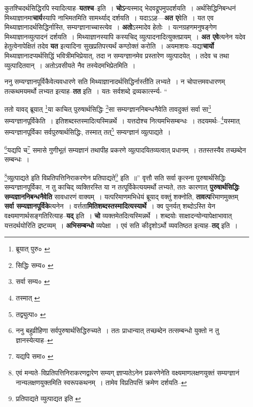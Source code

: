 \documentclass[article,12pt,a4paper]{memoir}
\begin{document}
	  \pstart कुतश्चिदर्थसिद्धिरपि स्यादित्याह--\textbf{यतश्च}--इति । \textbf{चोऽ}न्यस्माद् भेदवद्रूपमुपदर्शयति । अर्थसिद्धिनिबन्धनं मिथ्याज्ञानमा\textbf{चार्य}स्यापि नाभिमतमिति सामर्थ्याद् दर्शयति । यदाऽऽह—\textbf{अत ए}वेति । यत एव मिथ्याज्ञानादर्थसिद्धिर्नास्ति, सम्यग्ज्ञानाच्चास्त्येव । \textbf{अतो}ऽस्मादेव हेतोः । यत्नग्रहणमनुषङ्गेण मिथ्याज्ञानव्युत्पादनं दर्शयति । मिथ्याज्ञानस्यापि कस्यचिद् व्युत्पादनादित्युक्तप्रायम् । \textbf{अत एवे}त्यनेन यदेव हेतुत्वेनापेक्षितं तदेव \textbf{यत} इत्यादिना सुखप्रतिपत्त्यर्थं कण्ठोक्तं करोति । अयमाशयः--यद्या\textbf{चार्यो} मिथ्याज्ञानादप्यर्थसिद्धिं भवित्रीमभिप्रेयात्, तदा न सम्यग्ज्ञानमेव प्रस्तारेण व्युत्पादयेत् । तदेव च तथा व्युत्पादितवान् । अतोऽवसीयते नैव तस्येदमभिप्रेतमिति ।
	\pend
      

	  \pstart ननु सम्यग्ज्ञानपूर्विकैवेत्यवधारणे सति मिथ्याज्ञानादर्थसिद्धिर्नास्तीति लभ्यते । न चोपात्तमवधारणम् तत्कथमयमर्थो लभ्यत इत्याह--\textbf{तत} इति । यतः सर्वशब्दे द्रव्यकार्त्स्न्य- \leavevmode{} “
	  
	ततो यावद् ब्रूयात् \footnote{ब्रूयात् पुरु० \cite{dp-msB} \cite{dp-msC} \cite{dp-edP} \cite{dp-edH} \cite{dp-edE}}या काचित् पुरुषार्थसिद्धिः \footnote{सिद्धिः सम्य० \cite{dp-msA} \cite{dp-msC} \cite{dp-edP} \cite{dp-edH} \cite{dp-edE}}सा सम्यग्ज्ञाननिबन्धनैवेति तावदुक्तं सर्वा सा\footnote{सर्वा सम्य० \cite{dp-msD}} सम्यग्ज्ञानपूर्विकेति । इतिशब्दस्तस्मादित्यस्मिन्नर्थे । यत्तदोश्च नित्यमभिसम्बन्धः । तदयमर्थः--\footnote{तस्मात् \cite{dp-edP}}यस्मात् सम्यग्ज्ञानपूर्विका सर्वपुरुषार्थसिद्धिः, तस्मात् तत्\footnote{तद्व्युत्पा० \cite{dp-msA} \cite{dp-edP} \cite{dp-edH} \cite{dp-edE}} सम्यग्ज्ञानं व्युत्पाद्यते । 
	  
	\footnote{ननु बहुव्रीहिणा सर्वपुरुषार्थसिद्धिरुच्यते । ततः प्राधान्यात् तच्छब्देन तत्सम्बन्धो युक्तो न तु ज्ञानस्येत्याह--\cite{dp-msD-n}}यद्यपि च\footnote{यद्यपि समा० \cite{dp-msC}} समासे गुणीभूतं सम्यज्ञानं तथापीह प्रकरणे व्युत्पादयितव्यत्वात् प्रधानम् । ततस्तस्यैव तच्छब्देन सम्बन्धः । 
	  
	\footnote{एवं मन्यते--विप्रतिपत्तिनिराकरणद्वारेण सम्यग् ज्ञाप्यतेऽनेन प्रकरणेनेति वक्ष्यमाणलक्षणयुक्तं सम्यग्ज्ञानं नान्यलक्षणयुक्तमिति स्वरूपकथनम् । तामेव विप्रतिपत्तिं क्रमेण दर्शयति--\cite{dp-msD-n}}व्युत्पाद्यते इति विप्रतिपत्तिनिराकरणेन प्रतिपाद्यते\footnote{प्रतिपाद्यते व्युत्पाद्यत इति \cite{dp-edE} \cite{dp-edP}} इति ॥” वृत्तौ सति सर्वा कृत्स्ना पुरुषार्थसिद्धिः सम्यग्ज्ञानपूर्विका, न तु काचिद् व्यक्तिरस्ति या न तत्पूर्विकेत्ययमर्थो लभ्यते, ततः कारणात् \textbf{पुरुषार्थसिद्धिः सम्यज्ञाननिबन्धनैवेति} सावधारणं वाक्यम् । यत्परिमाणमभिधेयं ब्रूयाद् वक्तुं शक्नोति, \textbf{तावत्प}रिमाणमुक्तम् \textbf{सर्वा सम्यज्ञानपूर्विके}त्यनेन । वर्त्तता\textbf{मितिशब्दस्तस्मादित्यस्यार्थे} । क्व पुनर्यत् शब्दोऽस्ति येन वक्ष्यमाणार्थसङ्गतिरित्याह--\textbf{यद्} इति । \textbf{चो} \leavevmode{} व्यक्तमेतदित्यस्मिन्नर्थे । शब्दयोः साक्षादन्योन्यापेक्षाभावात् यत्तदर्थयोरिति द्रष्टव्यम् । \textbf{अभिसम्बन्धो} व्यपेक्षा । एवं सति कीदृशोऽर्थो व्यवतिष्ठत इत्याह--\textbf{तद्} इति ।
	\pend
      
\end{document}
